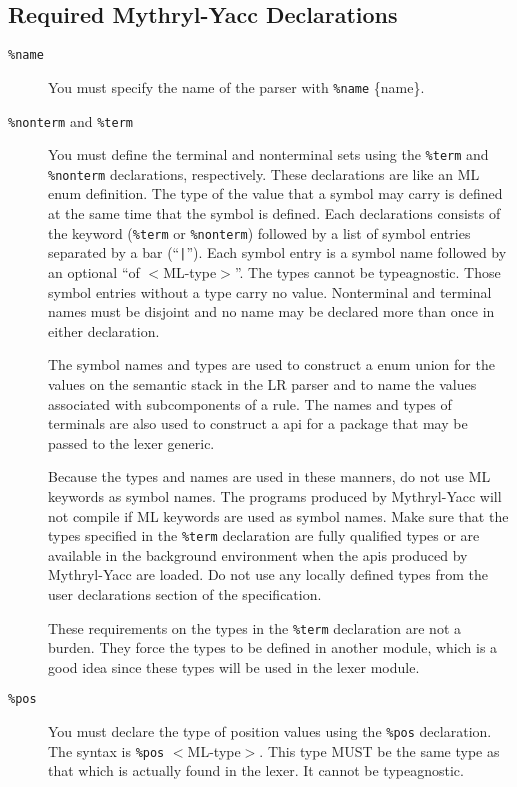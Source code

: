 \subsection{Required Mythryl-Yacc Declarations}
\begin{description}
\item[{\tt \%name}]
You must specify the name of the parser with {\tt \%name} \{name\}.
\item[{\tt \%nonterm} and {\tt \%term}]
You must define the terminal and nonterminal sets using the 
{\tt \%term} and {\tt \%nonterm}
declarations, respectively.  These declarations are like an ML enum
definition.
The type of the value that a symbol may carry is defined at the same time
that the symbol is defined.  Each declarations consists of the keyword
({\tt \%term} or {\tt \%nonterm})
followed by a list of symbol entries separated by a bar (``{\tt |}'').
Each symbol entry is a symbol name followed by an optional 
``of \/ $<$ML-type$>$''. The types cannot be typeagnostic.
Those symbol entries without a type carry no value.
Nonterminal and terminal names must be disjoint and no name may be declared
more than once in either declaration.

The symbol names and types are used to construct a enum union for the
values on the semantic stack in the LR parser and to name the values
associated with subcomponents of a rule.  The names and types of 
terminals are also used to construct a api for a package that
may be passed to the lexer generic.

Because the types and names are used in these manners, do
not use ML keywords as symbol names.   The programs produced by Mythryl-Yacc
will not compile if ML keywords are used as symbol names.  
Make sure that the types specified in the {\tt \%term} declaration are
fully qualified types or are available in the background
environment when the apis produced by Mythryl-Yacc are loaded.  Do
not use any locally defined types from the user declarations section of
the specification.

These requirements on the types in the {\tt \%term} declaration are not
a burden.
They force the types to be defined in another module,
which is a good idea since these types will
be used in the lexer module.
\item[{\tt \%pos}]
You must declare the type of position values using the {\tt \%pos} declaration.
The syntax is {\tt \%pos} $<$ML-type$>$.
This type MUST be the same type as that which is actually found in the lexer.
It cannot be typeagnostic.

\end{description}
